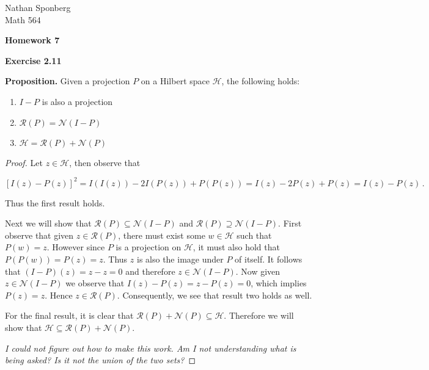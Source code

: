 \documentclass[a4paper]{article}
\numberwithin{equation}{section}
\begin{document}
\begin{flushright}
{\small{Nathan Sponberg\\}}
{\small{Math 564}}
\end{flushright}

\begin{center}
\bf{Homework 7}
\end{center}

\begin{description}

\item \textbf{Exercise 2.11}

\item \textbf{Proposition.} Given a projection $P$ on a Hilbert space $\mathcal{H}$, the following holds:

\begin{enumerate}

\item $I-P$ is also a projection
\item $\mathcal{R}(P) = \mathcal{N}(I-P)$
\item $\mathcal{H} = \mathcal{R}(P) + \mathcal{N}(P)$

\end{enumerate}

\begin{proof} Let $z \in \mathcal{H}$, then observe that

$$[I(z) - P(z)]^2 = I(I(z)) -2I(P(z)) + P(P(z)) = I(z) - 2P(z) + P(z) = I(z) - P(z)\,.$$

Thus the first result holds. 

Next we will show that $\mathcal{R}(P) \subseteq \mathcal{N}(I-P)$ and $\mathcal{R}(P) \supseteq \mathcal{N}(I-P)$. First observe that given $z \in \mathcal{R}(P)$, there must exist some $w \in \mathcal{H}$ such that $P(w) = z$. However since $P$ is a projection on $\mathcal{H}$, it must also hold that $P(P(w)) = P(z) = z$. Thus $z$ is also the image under $P$ of itself. It follows that $(I-P)(z) = z-z = 0$ and therefore $z \in \mathcal{N}(I-P)$. Now given $z \in \mathcal{N}(I-P)$ we observe that $I(z) - P(z) = z - P(z) = 0$, which implies $P(z) = z$. Hence $z \in \mathcal{R}(P)$. Consequently, we see that result two holds as well.

For the final result, it is clear that $\mathcal{R}(P)+\mathcal{N}(P) \subseteq \mathcal{H}$. Therefore we will show that $\mathcal{H} \subseteq \mathcal{R}(P)+\mathcal{N}(P)$. 

\textit{I could not figure out how to make this work. Am I not understanding what is being asked? Is it not the union of the two sets?}


\end{proof}
\end{description}
\end{document}
